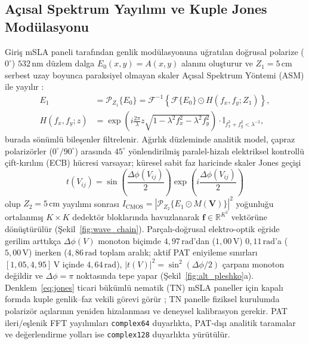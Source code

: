 \documentclass[journal]{IEEEtran}
\begin{document}
\subsection{A\c{c}\i{}sal Spektrum Yay\i{}l\i{}m\i{} ve Kuple Jones Mod\"ulasyonu}
Giri\c{s} mSLA paneli taraf\i{}ndan genlik mod\"ulasyonuna u\u{g}rat\i{}lan do\u{g}rusal polarize ($0^\circ$) $532\,\text{nm}$ d\"uzlem dalga $E_0(x,y) = A(x,y)$ alan\i{}n\i{} olu\c{s}turur ve $Z_1 = 5\,\text{cm}$ serbest uzay boyunca paraksiyel olmayan skaler A\c{c}\i{}sal Spektrum Y\"ontemi (ASM) ile yay\i{}l\i{}r \cite{goodman2017fourier}:
\begin{align}
  E_1 &= \mathcal{P}_{Z_1}\{E_0\} = \mathcal{F}^{-1}\!\left\{\mathcal{F}\{E_0\} \odot H(f_x, f_y; Z_1)\right\}, \label{eq:asm} \\
  H(f_x, f_y; z) &= \exp\!\left(i\frac{2\pi}{\lambda}z\sqrt{1 - \lambda^2 f_x^2 - \lambda^2 f_y^2}\right) \cdot \mathbb{I}_{f_x^2+f_y^2 < \lambda^{-2}}, \label{eq:transfer}
\end{align}
burada s\"on\"uml\"u bile\c{s}enler filtrelenir. A\u{g}\i{}rl\i{}k d\"uzleminde analitik model, \c{c}apraz polariz\"orler ($0^\circ/90^\circ$) aras\i{}nda $45^\circ$ y\"onlendirilmi\c{s} paralel-hizal\i{} elektriksel kontroll\"u \c{c}ift-k\i{}r\i{}l\i{}m (ECB) h\"ucresi varsayar; k\"uresel sabit faz haricinde skaler Jones ge\c{c}i\c{s}i
\begin{equation}
  t(V_{ij}) = \sin\!\left(\frac{\Delta\phi(V_{ij})}{2}\right) \exp\!\left(i\frac{\Delta\phi(V_{ij})}{2}\right)
  \label{eq:jones}
\end{equation}
olup $Z_2 = 5\,\text{cm}$ yay\i{}l\i{}m\i{} sonras\i{} $I_{\mathrm{CMOS}} = |\mathcal{P}_{Z_2}\{E_1 \odot M(\mathbf{V})\}|^2$ yo\u{g}unlu\u{g}u ortalanm\i{}\c{s} $K\times K$ dedekt\"or bloklar\i{}nda havuzlanarak $\mathbf{f} \in \mathbb{R}^{K^2}$ vekt\"or\"une d\"on\"u\c{s}t\"ur\"ul\"ur (\c{S}ekil~\ref{fig:wave_chain}). Par\c{c}al\i{}-do\u{g}rusal elektro-optik e\u{g}ride gerilim artt\i{}k\c{c}a $\Delta\phi(V)$ monoton bi\c{c}imde $4{,}97\,\text{rad}$'dan ($1{,}00\,\text{V}$) $0{,}11\,\text{rad}$'a ($5{,}00\,\text{V}$) inerken ($4{,}86\,\text{rad}$ toplam aral\i{}k; aktif PAT eniyileme s\i{}n\i{}rlar\i{} $[1{,}05, 4{,}95]\,\text{V}$ i\c{c}inde $4{,}64\,\text{rad}$), $|t(V)|^2 = \sin^2(\Delta\phi/2)$ \c{c}arpan\i{} monoton de\u{g}ildir ve $\Delta\phi = \pi$ noktas\i{}nda tepe yapar (\c{S}ekil~\ref{fig:alt_pleshko}a). Denklem~\eqref{eq:jones} ticari b\"uk\"uml\"u nematik (TN) mSLA paneller i\c{c}in kapal\i{} formda kuple genlik--faz vekili g\"orevi g\"or\"ur \cite{lu1990lctv}; TN panelle fiziksel kurulumda polariz\"or a\c{c}\i{}lar\i{}n\i{}n yeniden hizalanmas\i{} ve deneysel kalibrasyon gerekir. PAT ileri/e\c{s}lenik FFT yay\i{}l\i{}mlar\i{} \texttt{complex64} duyarl\i{}kta, PAT-d\i{}\c{s}\i{} analitik taramalar ve de\u{g}erlendirme yollar\i{} ise \texttt{complex128} duyarl\i{}kta y\"ur\"ut\"ul\"ur.
\end{document}

